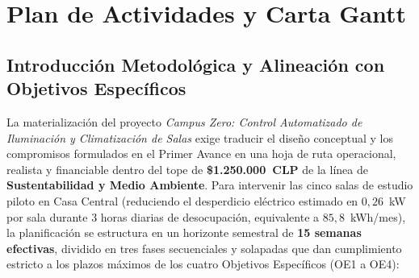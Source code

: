 
\section{Plan de Actividades y Carta Gantt}
\label{sec:gantt}

\subsection{Introducción Metodológica y Alineación con Objetivos Específicos}
La materialización del proyecto \textit{Campus Zero: Control Automatizado de Iluminación y Climatización de Salas} exige traducir el diseño conceptual y los compromisos formulados en el Primer Avance en una hoja de ruta operacional, realista y financiable dentro del tope de \textbf{\$1.250.000~CLP} de la línea de \textbf{Sustentabilidad y Medio Ambiente}. Para intervenir las cinco salas de estudio piloto en Casa Central (reduciendo el desperdicio eléctrico estimado en $0{,}26$~kW por sala durante 3 horas diarias de desocupación, equivalente a $85{,}8$~kWh/mes), la planificación se estructura en un horizonte semestral de \textbf{15 semanas efectivas}, dividido en tres fases secuenciales y solapadas que dan cumplimiento estricto a los plazos máximos de los cuatro Objetivos Específicos (OE1 a OE4):

